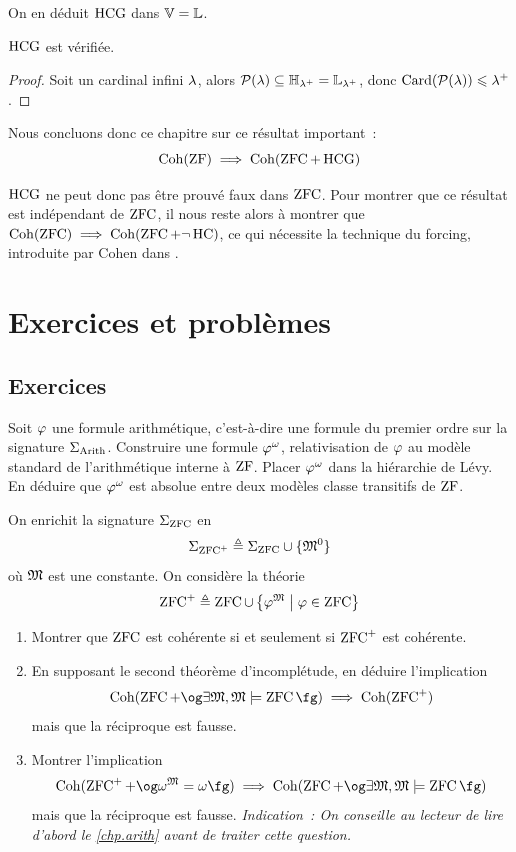 \noindent
On en déduit $\operatorname{HCG}$ dans $\mathbb V = \mathbb L$.

\begin{theorem}
  $\operatorname{HCG}$ est vérifiée.
\end{theorem}

\begin{proof}
  Soit un cardinal infini $\lambda$, alors
  $\mathcal{P}(\lambda) \subseteq \mathbb H_{\lambda^{+}} = \mathbb L_{\lambda^{+}}$,
  donc $\operatorname{Card}(\mathcal{P}(\lambda)) \leqslant \lambda^{+}$.
\end{proof}

Nous concluons donc ce chapitre sur ce résultat important~:
\[\operatorname{Coh}(\operatorname{ZF}) \implies \operatorname{Coh}(\operatorname{ZFC} + \operatorname{HCG})\]

$\operatorname{HCG}$ ne peut donc pas être prouvé faux dans $\operatorname{ZFC}$. Pour montrer que ce
résultat est indépendant de $\operatorname{ZFC}$, il nous reste alors à montrer que
$\operatorname{Coh}(\operatorname{ZFC})\implies\operatorname{Coh}(\operatorname{ZFC}+\lnot\operatorname{HC})$, ce qui nécessite la technique du
forcing, introduite par Cohen dans
\cite{Cohen1963,Cohen1964}.

\clearpage

\section{Exercices et problèmes}

\subsection{Exercices}

\begin{exercise}
  Soit $\varphi$ une formule arithmétique, c'est-à-dire une formule du premier
  ordre sur la signature $\Sigma_{\operatorname{Arith}}$. Construire une formule $\varphi^{\omega}$,
  relativisation de $\varphi$ au modèle standard de l'arithmétique interne à
  $\operatorname{ZF}$. Placer $\varphi^{\omega}$ dans la hiérarchie de Lévy. En déduire que
  $\varphi^{\omega}$ est absolue entre deux modèles classe transitifs de $\operatorname{ZF}$.
\end{exercise}

\begin{exercise}
  On enrichit la signature $\Sigma_{\operatorname{ZFC}}$ en
  \[\Sigma_{\operatorname{ZFC}^{+}} \triangleq \Sigma_{\operatorname{ZFC}} \cup\{\mathfrak{M}^0\}\]
  où $\mathfrak{M}$ est une constante. On considère la théorie
  \[\operatorname{ZFC}^+ \triangleq \operatorname{ZFC} \cup \left\{ \varphi^{\mathfrak{M}} \;\middle\vert\; \varphi\in\operatorname{ZFC} \right\}\]
  \begin{enumerate}[label=(\roman*)]
  \item Montrer que $\operatorname{ZFC}$ est cohérente si et seulement si $\operatorname{ZFC}^+$ est
    cohérente.
  \item En supposant le second théorème d'incomplétude, en déduire l'implication
    \[\Coher(\ZFC + \ogM \exists \varMM, \varMM\satisf\ZFC\fgM)\implies
    \Coher(\ZFC^+)\]
    mais que la réciproque est fausse.
  \item Montrer l'implication
    \[\Coher(\ZFC^+ + \ogM \omega^{\varMM} = \omega\fgM)\implies
    \Coher(\ZFC + \ogM \exists \varMM, \varMM\satisf\ZFC\fgM)\]
    mais que la réciproque est fausse. \textit{Indication~: On conseille au
      lecteur de lire d'abord le \cref{chp.arith} avant de traiter cette
      question.}
  \end{enumerate}
\end{exercise}

